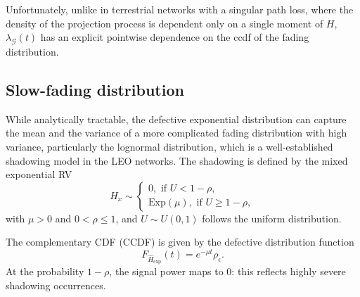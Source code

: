 \documentclass[lettersize,journal]{IEEEtran}
\begin{document}
Unfortunately, unlike in terrestrial networks with a singular path loss, where the density of the projection process is dependent only on a single moment of $H$, $\lambda_{\mathcal{G}}(t)$ has an explicit pointwise dependence on the ccdf of the fading distribution. 


\subsection{Slow-fading distribution}
While analytically tractable, the defective exponential distribution can capture the mean and the variance of a more complicated fading distribution with high variance, particularly the lognormal distribution, which is a well-established shadowing model in the LEO networks. The shadowing is defined by the mixed exponential RV
\begin{equation}
  \hat{H}_x \sim
  \begin{cases}
    0, \text{ if } U < 1-\rho,\\
    \text{Exp}(\mu), \text{ if } U \geq1- \rho,              \label{eq:tier2exponential}
  \end{cases}
\end{equation}
with $\mu>0$ and $0<\rho\leq1$, and $U \sim U(0,1)$ follows the uniform distribution.


The complementary CDF (CCDF) is given by the defective distribution function
\begin{equation}
  \label{eq:defexp}
  F_{\hat{H}_{\text{exp}}}(t)=e^{-\mu t}\rho_{\epsilon}.
\end{equation}
At the probability $1-\rho$, the signal power maps to $0$: this reflects highly severe shadowing occurrences. 
\end{document}
